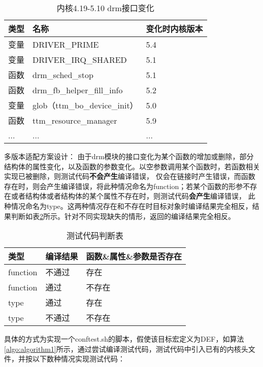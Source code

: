 \begin{table}[h]
  \centering
  \caption{内核4.19-5.10 drm接口变化}
  \label{tab:内核4.19-5.10 drm接口变化}
  \begin{tabular}{lll}
    \toprule
    类型   &   名称  &变化时内核版本  \\
    \midrule
    变量 & DRIVER\_PRIME & 5.4 \\
    变量 & DRIVER\_IRQ\_SHARED & 5.1 \\
    函数 & drm\_sched\_stop & 5.1 \\
    函数 & drm\_fb\_helper\_fill\_info & 5.2 \\
    变量 & glob（ttm\_bo\_device\_init） & 5.0 \\
    函数 & ttm\_resource\_manager & 5.9 \\
    ... & ... & ... \\
    \bottomrule
  \end{tabular}
\end{table}

多版本适配方案设计：
由于drm模块的接口变化为某个函数的增加或删除，部分结构体的属性变化，以及函数的参数变化。以空参数调用某个函数时，若函数相关实现已被删除，则测试代码\textbf{不会产生}编译错误，
仅会在链接时产生错误，而函数存在时，则会产生编译错误，将此种情况命名为function；若某个函数的形参不存在或者结构体或者结构体的某个属性不存在时，则测试代码\textbf{会产生}编译错误，
此种情况命名为type。这两种情况存在和不存在时目标对象时编译结果完全相反，结果判断如表\ref{tab:测试代码判断表}所示。针对不同实现缺失的情形，返回的编译结果完全相反。

\begin{table}[h]
  \centering
  \caption{测试代码判断表}
  \label{tab:测试代码判断表}
  \begin{tabular}{lll}
    \toprule
    类型   &   编译结果 & 函数\&属性\&参数是否存在    \\
    \midrule
    function & 不通过 & 存在 \\
    function & 通过 & 不存在 \\
    type & 通过 & 存在 \\
    type & 不通过 & 不存在 \\
    \bottomrule
  \end{tabular}
\end{table}

具体的方式为实现一个conftest.sh的脚本，假使该目标宏定义为DEF，如算法\ref{algo:algorithm1}所示，通过尝试编译测试代码，测试代码中引入已有的内核头文件，并按以下数种情况实现测试代码：

